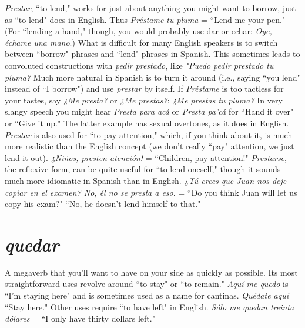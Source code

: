 \emph{Prestar}, ``to lend," works for just about anything you might
want to borrow, just as ``to lend" does in English. Thus \emph{Préstame tu
pluma} = ``Lend me your pen." (For ``lending a hand," though, you
would probably use dar or echar: \emph{Oye, échame una mano}.) What is
difficult for many English speakers is to switch between ``borrow"
phrases and ``lend" phrases in Spanish. This sometimes leads to convoluted constructions with \emph{pedir prestado}, like \emph{"Puedo pedir prestado tu
pluma?} Much more natural in Spanish is to turn it around (i.e., saying
``you lend" instead of ``I borrow") and use \emph{prestar} by itself. If \emph{Préstame}
is too tactless for your tastes, say \emph{¿Me presta?} or \emph{¿Me prestas?}: \emph{¿Me
prestas tu pluma?} In very slangy speech you might hear \emph{Presta para
acá} or \emph{Presta pa'cá} for ``Hand it over" or ``Give it up." The latter example has sexual overtones, as it does in English.
\emph{Prestar} is also used for ``to pay attention," which, if you think
about it, is much more realistic than the English concept (we don't really ``pay" attention, we just lend it out). \emph{¿Niños, presten atención!} =
``Children, pay attention!" \emph{Prestarse}, the reflexive form, can be quite
useful for ``to lend oneself," though it sounds much more idiomatic in
Spanish than in English. \emph{¿Tú crees que Juan nos deje copiar en el examen? No, él no se presta a eso}. = ``Do you think Juan will let us copy
his exam?" ``No, he doesn't lend himself to that."

\section{\emph{quedar}}

A megaverb that you'll want to have on your side as quickly as
possible. Its most straightforward uses revolve around ``to stay" or ``to
remain." \emph{Aquí me quedo} is ``I'm staying here" and is sometimes used
as a name for cantinas. \emph{Quédate aquí} = ``Stay here." Other uses
require ``to have left" in English. \emph{Sólo me quedan treinta dólares} = ``I
only have thirty dollars left."

